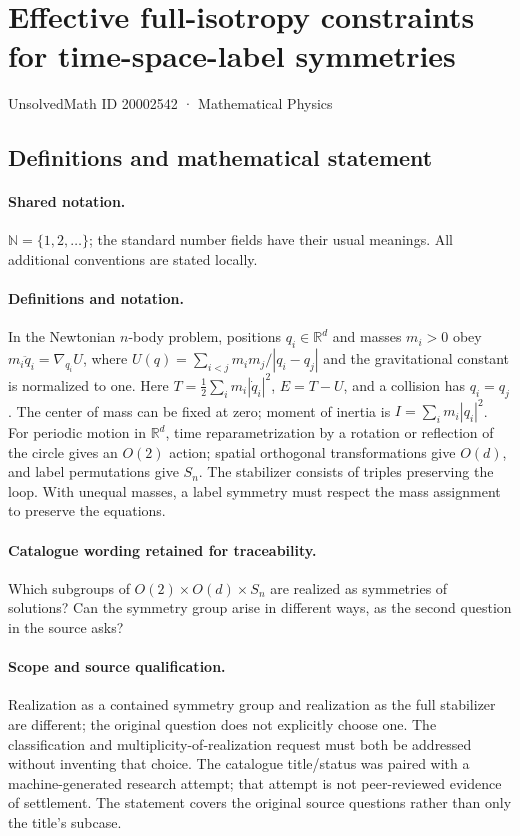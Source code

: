 \documentclass[11pt]{article}
\begin{document}
\setcounter{section}{20002541}
\section{Effective full-isotropy constraints for time-space-label symmetries}\label{20002542}
{\small UnsolvedMath ID 20002542 · Mathematical Physics}
\subsection{Definitions and mathematical statement}

\paragraph{Shared notation.}$\mathbb N=\{1,2,\ldots\}$; the standard number fields have their usual meanings. All additional conventions are stated locally.


\paragraph{Definitions and notation.}In the Newtonian $n$-body problem, positions $q_i\in\mathbb R^d$ and masses $m_i>0$ obey $m_i\ddot q_i=\nabla_{q_i}U$, where $U(q)=\sum_{i<j}m_im_j/|q_i-q_j|$ and the gravitational constant is normalized to one. Here $T=\tfrac12\sum_i m_i|\dot q_i|^2$, $E=T-U$, and a collision has $q_i=q_j$. The center of mass can be fixed at zero; moment of inertia is $I=\sum_i m_i|q_i|^2$. For periodic motion in $\mathbb R^d$, time reparametrization by a rotation or reflection of the circle gives an $O(2)$ action; spatial orthogonal transformations give $O(d)$, and label permutations give $S_n$. The stabilizer consists of triples preserving the loop. With unequal masses, a label symmetry must respect the mass assignment to preserve the equations.

\paragraph{Catalogue wording retained for traceability.}
Which subgroups of $O(2)\times O(d)\times S_n$ are realized as symmetries of solutions? Can the symmetry group arise in different ways, as the second question in the source asks?
\paragraph{Scope and source qualification.}Realization as a contained symmetry group and realization as the full stabilizer are different; the original question does not explicitly choose one. The classification and multiplicity-of-realization request must both be addressed without inventing that choice. The catalogue title/status was paired with a machine-generated research attempt; that attempt is not peer-reviewed evidence of settlement. The statement covers the original source questions rather than only the title’s subcase.
\end{document}
